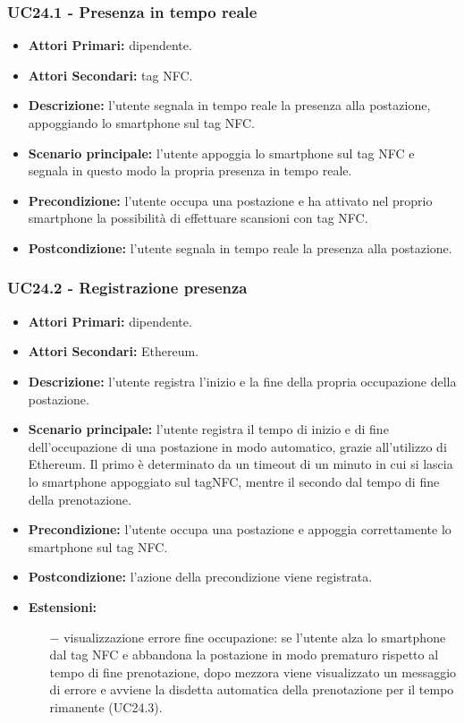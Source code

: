 \subsubsection{ UC24.1 - Presenza in tempo reale}
\begin{itemize}
	\item\textbf{Attori Primari:} dipendente.
	\item\textbf{Attori Secondari:} tag NFC.
	\item\textbf{Descrizione:} l’utente segnala in tempo reale la presenza alla postazione, appoggiando lo smartphone sul tag NFC.
	\item\textbf{Scenario principale:} l’utente appoggia lo smartphone sul tag NFC e segnala in questo modo la propria presenza in tempo reale.
	\item\textbf{Precondizione:} l’utente occupa una postazione e ha attivato nel proprio smartphone la possibilità di effettuare scansioni con tag NFC.
	\item\textbf{Postcondizione:} l’utente segnala in tempo reale la presenza alla postazione.
\end{itemize}


\subsubsection{ UC24.2 - Registrazione presenza}
\begin{itemize}
	\item\textbf{Attori Primari:} dipendente.
	\item\textbf{Attori Secondari:} Ethereum.
	\item\textbf{Descrizione:} l’utente registra l'inizio e la fine della propria occupazione della postazione.
	\item\textbf{Scenario principale:} l'utente registra il tempo di inizio e di fine dell'occupazione di una postazione in modo automatico, grazie all'utilizzo di Ethereum. Il primo è determinato da un timeout di un minuto in cui si lascia lo smartphone appoggiato sul tagNFC, mentre il secondo dal tempo di fine della prenotazione.
	\item\textbf{Precondizione:} l’utente occupa una postazione e appoggia correttamente lo smartphone sul tag NFC. 
	\item\textbf{Postcondizione:} l'azione della precondizione viene registrata.
	\item\textbf{Estensioni:} 
	\begin{itemize}
		\item[$-$] visualizzazione errore fine occupazione: se l'utente alza lo smartphone dal tag NFC e abbandona la postazione in modo prematuro rispetto al tempo di fine prenotazione, dopo mezzora viene visualizzato un messaggio di errore e avviene la disdetta automatica della prenotazione per il tempo rimanente (UC24.3).
	\end{itemize}
\end{itemize}

